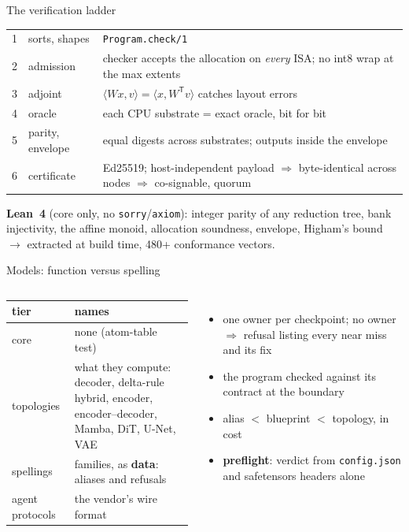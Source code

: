 \documentclass[aspectratio=169,11pt]{beamer}
\begin{document}
\begin{frame}{The verification ladder}
\small
\begin{tabularx}{\linewidth}{@{}clX@{}}
\toprule
1 & sorts, shapes & \texttt{Program.check/1} \\
2 & admission & checker accepts the allocation on \emph{every} ISA; no int8 wrap at the max extents \\
3 & adjoint & $\langle Wx,v\rangle = \langle x,W^{\mathsf T}v\rangle$ catches layout errors \\
4 & oracle & each CPU substrate = exact oracle, bit for bit \\
5 & parity, envelope & equal digests across substrates; outputs inside the envelope \\
6 & certificate & Ed25519; host-independent payload $\Rightarrow$ byte-identical across nodes $\Rightarrow$ co-signable, quorum \\
\bottomrule
\end{tabularx}

\vspace{0.6em}
\textbf{Lean~4} (core only, no \texttt{sorry}/\texttt{axiom}): integer parity of any reduction tree, bank injectivity, the affine monoid, allocation soundness, envelope, Higham's bound $\to$ extracted at build time, 480+ conformance vectors.
\end{frame}

\begin{frame}{Models: function versus spelling}
\begin{columns}[T]
\small
\begin{tabularx}{\linewidth}{@{}lX@{}}
\toprule
tier & names \\
\midrule
core & none (atom-table test) \\
topologies & what they compute: decoder, delta-rule hybrid, encoder, encoder--decoder, Mamba, DiT, U-Net, VAE \\
spellings & families, as \textbf{data}: aliases and refusals \\
agent protocols & the vendor's wire format \\
\bottomrule
\end{tabularx}
\small
\begin{itemize}
\item one owner per checkpoint; no owner $\Rightarrow$ refusal listing every near miss and its fix
\item the program checked against its contract at the boundary
\item alias $<$ blueprint $<$ topology, in cost
\item \textbf{preflight}: verdict from \texttt{config.json} and safetensors headers alone
\end{itemize}
\end{columns}
\end{frame}
\end{document}
